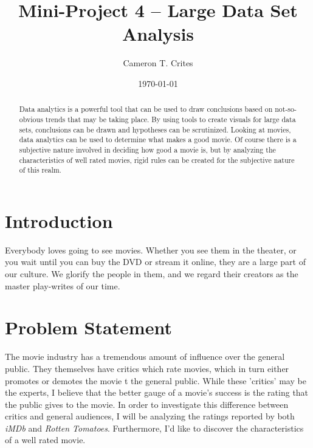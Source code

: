 \documentclass[10pt]{article}
\title{Mini-Project 4 -- Large Data Set Analysis}
\date{\today}
\author{Cameron T. Crites}
\begin{document}
\maketitle
\begin{abstract}
	Data analytics is a powerful tool that can be used to draw conclusions based on not-so-obvious trends that may be taking place. By using tools to create visuals for large data sets, conclusions can be drawn and hypotheses can be scrutinized. Looking at movies, data analytics can be used to determine what makes a good movie. Of course there is a subjective nature involved in deciding how good a movie is, but by analyzing the characteristics of well rated movies, rigid rules can be created for the subjective nature of this realm.
\end{abstract}
\pagebreak

\section*{Introduction}\label{Sec_Introduction}
Everybody loves going to see movies. Whether you see them in the theater, or you wait until you can buy the DVD or stream it online, they are a large part of our culture. We glorify the people in them, and we regard their creators as the master play-writes of our time. 

\section*{Problem Statement}\label{Sec_Problem}
The movie industry has a tremendous amount of influence over the general public. They themselves have critics which rate movies, which in turn either promotes or demotes the movie t the general public. While these 'critics' may be the experts, I believe that the better gauge of a movie's success is the rating that the public gives to the movie. In order to investigate this difference between critics and general audiences, I will be analyzing the ratings reported by both \textit{iMDb} and \textit{Rotten Tomatoes}. Furthermore, I'd like to discover the characteristics of a well rated movie.
\end{document}
